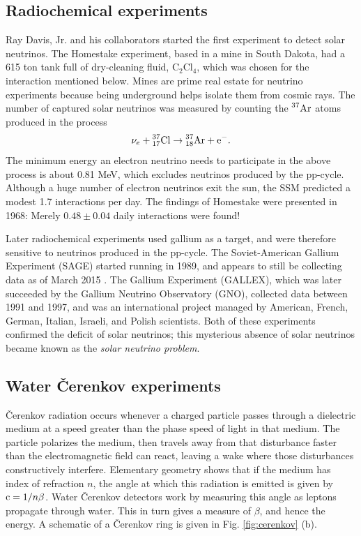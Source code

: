 \subsection{Radiochemical experiments}
Ray Davis, Jr. and his collaborators started the first experiment to detect
solar neutrinos. The Homestake experiment, based in a mine in South Dakota,
had a 615 ton tank full of dry-cleaning fluid, $\text{C}_2\text{Cl}_4$,
which was chosen for the interaction mentioned below.
Mines are prime real estate for neutrino experiments because being underground
helps isolate them from cosmic rays. The number of captured solar neutrinos
was measured by counting the $\prescript{37}{}{\text{Ar}}$ atoms produced in
the process
\begin{equation}
  \nu_e+\prescript{37}{17}{\text{Cl}}\to
        \prescript{37}{18}{\text{Ar}}+\text{e}^-.
\end{equation}
The minimum energy an electron neutrino needs to participate in the above
process is about 0.81 MeV, which excludes neutrinos produced by the pp-cycle.
Although a huge number of electron neutrinos exit the sun, the SSM
predicted a modest 1.7 interactions per day. The findings
of Homestake were presented in 1968: Merely $0.48\pm0.04$ daily interactions
were found!

Later radiochemical experiments used gallium as a target, and were therefore
sensitive to neutrinos produced in the pp-cycle. The Soviet-American
Gallium Experiment (SAGE) started running in 1989, and appears to still be
collecting data as of March 2015 \cite{gavrin_current_2015}. 
The Gallium Experiment (GALLEX),
which was later succeeded by the Gallium Neutrino Observatory (GNO),
collected data between 1991 and 1997, and was an international project
managed by American, French, German, Italian, Israeli, and Polish scientists.
Both of these experiments confirmed the deficit of solar neutrinos; this
mysterious absence of solar neutrinos became known as the {\it solar
neutrino problem}.

\subsection{Water \v{C}erenkov experiments}
\v{C}erenkov radiation occurs whenever a charged particle passes through a
dielectric medium at a speed greater than the phase speed of light in that
medium. The particle polarizes the medium, then travels away from that
disturbance faster than the electromagnetic field can react, leaving
a wake where those disturbances constructively interfere. Elementary
geometry shows that if the medium has index of refraction $n$, the angle
at which this radiation is emitted is given by $\operatorname{c}=1/n\beta$. Water
\v{C}erenkov detectors work by measuring this angle as leptons propagate
through water. This in turn gives a measure of $\beta$, and hence the energy.
A schematic of a \v{C}erenkov ring is given in Fig. \ref{fig:cerenkov} (b).

